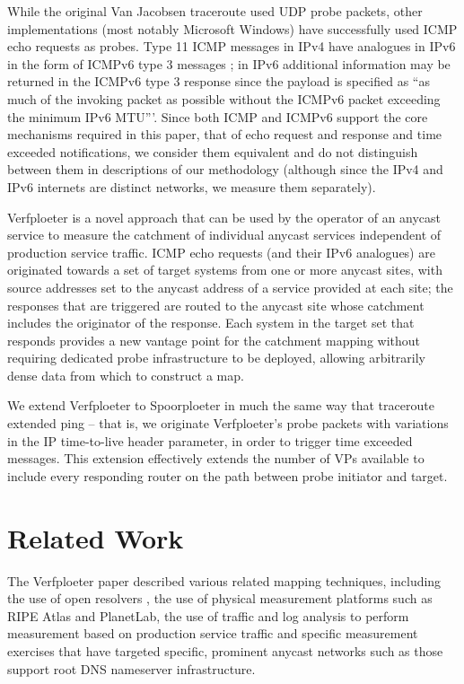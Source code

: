 \documentclass[9pt,technote,letterpaper]{IEEEtran}
\begin{document}
While the original Van Jacobsen traceroute used UDP probe packets, other implementations (most notably Microsoft Windows) have successfully used ICMP echo requests as probes. Type 11 ICMP messages in IPv4 have analogues in IPv6 \cite{RFC8200} in the form of ICMPv6 type 3 messages \cite{RFC4443}; in IPv6 additional information may be returned in the ICMPv6 type 3 response since the payload is specified as ``as much of the invoking packet as possible without the ICMPv6 packet exceeding the minimum IPv6 MTU'''. Since both ICMP and ICMPv6 support the core mechanisms required in this paper, that of echo request and response and time exceeded notifications, we consider them equivalent and do not distinguish between them in descriptions of our methodology (although since the IPv4 and IPv6 internets are distinct networks, we measure them separately).

Verfploeter\cite{Vries17b} is a novel approach that can be used by the operator of an anycast service to measure the catchment of individual anycast services independent of production service traffic. ICMP echo requests (and their IPv6 analogues) are originated towards a set of target systems from one or more anycast sites, with source addresses set to the anycast address of a service provided at each site; the responses that are triggered are routed to the anycast site whose catchment includes the originator of the response. Each system in the target set that responds provides a new vantage point for the catchment mapping without requiring dedicated probe infrastructure to be deployed, allowing arbitrarily dense data from which to construct a map.

We extend Verfploeter to Spoorploeter in much the same way that traceroute extended ping -- that is, we originate Verfploeter's probe packets with variations in the IP time-to-live header parameter, in order to trigger time exceeded messages. This extension effectively extends the number of VPs available to include every responding router on the path between probe initiator and target.

\section{Related Work}
The Verfploeter paper described various related mapping techniques, including the use of open resolvers \cite{Fan13a}, the use of physical measurement platforms such as RIPE Atlas and PlanetLab, the use of traffic and log analysis to perform measurement based on production service traffic and specific measurement exercises that have targeted specific, prominent anycast networks such as those support root DNS nameserver infrastructure.
\end{document}
